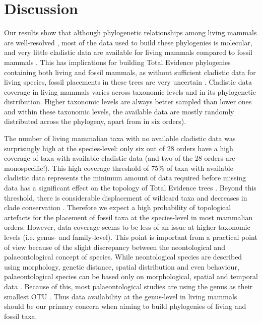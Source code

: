 %
%

\section{Discussion}
Our results show that although phylogenetic relationships among living mammals are well-resolved \citep[e.g.][]{BinindaEmonds,meredithimpacts2011} , most of the data used to build these phylogenies is molecular, and very little cladistic data are available for living mammals compared to fossil mammals \citep[e.g.][]{O'Leary08022013,ni2013oldest}.
This has implications for building Total Evidence phylogenies containing both living and fossil mammals, as without sufficient cladistic data for living species, fossil placements in these trees are very uncertain \citep{GuillermeCooper}.
Cladistic data coverage in living mammals varies across taxonomic levels and in its phylogenetic distribution.
Higher taxonomic levels are always better sampled than lower ones and within these taxonomic levels, the available data are mostly randomly distributed across the phylogeny, apart from in six orders).

The number of living mammalian taxa with no available cladistic data was surprisingly high at the species-level: only six out of 28 orders have a high coverage of taxa with available cladistic data (and two of the 28 orders are monospecific!).
This high coverage threshold of 75\% of taxa with available cladistic data represents the minimum amount of data required before missing data has a significant effect on the topology of Total Evidence trees \citep{GuillermeCooper}.
Beyond this threshold, there is considerable displacement of wildcard taxa \citep[\textit{sensu}][]{kearneyfragmentary2002} and decreases in clade conservation \citep{GuillermeCooper}.
Therefore we expect a high probability of topological artefacts for the placement of fossil taxa at the species-level in most mammalian orders.
However, data coverage seems to be less of an issue at higher taxonomic levels (i.e. genus- and family-level).
This point is important from a practical point of view because of the slight discrepancy between the neontological and palaeontological concept of species.
While neontological species are described using morphology, genetic distance, spatial distribution and even behaviour, palaeontological species can be based only on morphological, spatial and temporal data \citep[e.g.][]{ni2013oldest}.
Because of this, most palaeontological studies are using the genus as their smallest OTU \citep[e.g.][]{ni2013oldest,O'Leary08022013}.
Thus data availability at the genus-level in living mammals should be our primary concern when aiming to build phylogenies of living and fossil taxa.

